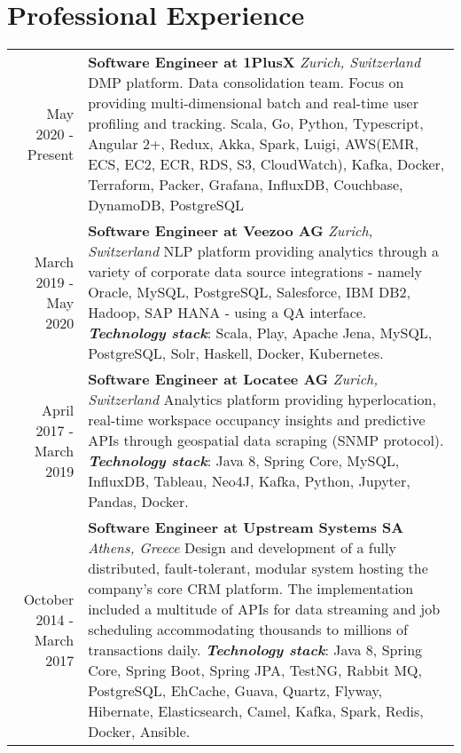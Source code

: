\documentclass{article}
\begin{document}
	\section*{\color{NavyBlue}Professional Experience}
	\vspace{-0.5cm}	
	{\color{NavyBlue}\hrulefill}
	
	\begin{longtable}{r  p{12cm}}
			\small May 2020 - Present  & \textbf{\large Software Engineer at 1PlusX} \textit{\footnotesize Zurich, Switzerland} \newline
		DMP platform. Data consolidation team. Focus on providing multi-dimensional batch and real-time user profiling and tracking. \newline
	    Scala, Go, Python, Typescript, Angular 2+, Redux, Akka, Spark, Luigi, AWS(EMR, ECS, EC2, ECR, RDS, S3, CloudWatch), Kafka, Docker, Terraform, Packer, Grafana, InfluxDB, Couchbase, DynamoDB, PostgreSQL \\ [1ex] 
		\small March 2019 - May 2020  & \textbf{\large Software Engineer at Veezoo AG} \textit{\footnotesize Zurich, Switzerland} \newline
		NLP platform providing analytics through a variety of corporate data source integrations - namely Oracle, MySQL, PostgreSQL, Salesforce, IBM DB2, Hadoop, SAP HANA - using a QA interface.\newline
		\textit{\textbf{Technology stack}}: Scala, Play, Apache Jena, MySQL, PostgreSQL, Solr, Haskell, Docker, Kubernetes. \\ [1ex] 
		
		\small April 2017 - March 2019  & \textbf{\large Software Engineer at Locatee AG} \textit{\footnotesize Zurich, Switzerland} \newline 
		Analytics platform providing hyperlocation, real-time workspace occupancy insights and predictive APIs through geospatial data scraping (SNMP protocol). \newline
		\textit{\textbf{Technology stack}}: Java 8, Spring Core, MySQL, InfluxDB, Tableau, Neo4J, Kafka, Python, Jupyter, Pandas, Docker. \\ [1ex]
		
		\small October 2014 - March 2017  & \textbf{\large Software Engineer at Upstream Systems SA} \textit{\footnotesize Athens, Greece} \newline 
		Design and development of a fully distributed, fault-tolerant, modular system hosting the company's core CRM platform. The implementation included a multitude of APIs for data streaming and job scheduling accommodating thousands to millions of transactions daily. \newline
		\textit{\textbf{Technology stack}}: Java 8, Spring Core, Spring Boot, Spring JPA, TestNG, Rabbit MQ, PostgreSQL, EhCache, Guava, Quartz, Flyway, Hibernate, Elasticsearch, Camel, Kafka, Spark, Redis, Docker, Ansible. \\ [1ex]
		

\end{longtable}
\end{document}
